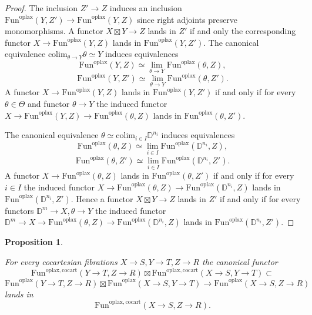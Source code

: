 \documentclass[10pt,oneside]{article}
\numberwithin{equation}{section} %
\numberwithin{figure}{section} %
\theoremstyle{plain}
\newtheorem{proposition}[theorem]{Proposition}
\theoremstyle{definition}
\newcommand{\bD}{{\mathbb D}}
\newcommand{\colim}{\mathrm{colim}}
\newcommand{\Fun}{\mathrm{Fun}}
\newcommand{\cocart}{{\mathrm{cocart}}}
\newcommand{\oplax}{{\mathrm{oplax}}}
\begin{document}
\begin{proof}

The inclusion $Z' \to Z$  induces an inclusion $\Fun^\oplax(Y, Z') \to \Fun^\oplax(Y, Z)$ since right adjoints preserve monomorphisms.
A functor $X \boxtimes Y \to Z$ lands in $Z'$
if and only the corresponding functor $X \to \Fun^\oplax(Y, Z)$
lands in $\Fun^\oplax(Y, Z')$.
The canonical equivalence $ \colim_{\theta \to Y} \theta \simeq Y$
induces equivalences
$$ \Fun^\oplax(Y, Z) \simeq \lim_{\theta \to Y} \Fun^\oplax(\theta, Z),$$
$$ \Fun^\oplax(Y, Z') \simeq \lim_{\theta \to Y} \Fun^\oplax(\theta, Z').$$
A functor $X \to \Fun^\oplax(Y, Z)$
lands in $\Fun^\oplax(Y, Z')$ if and only if for every $\theta \in \Theta$ and functor $\theta \to Y$ the induced functor $X \to \Fun^\oplax(Y, Z) \to \Fun^\oplax(\theta, Z)$
lands in $\Fun^\oplax(\theta, Z'). $

The canonical equivalence $\theta \simeq \colim_{i \in I} \bD^{n_i}$
induces equivalences
$$ \Fun^\oplax(\theta, Z) \simeq \lim_{i \in I} \Fun^\oplax(\bD^{n_i}, Z),$$
$$\Fun^\oplax(\theta, Z') \simeq \lim_{i \in I} \Fun^\oplax(\bD^{n_i}, Z').$$
A functor $X \to \Fun^\oplax(\theta, Z)$
lands in $\Fun^\oplax(\theta, Z')$ if and only if for every $i \in I$ the induced functor $X \to \Fun^\oplax(\theta, Z) \to \Fun^\oplax(\bD^{n_i}, Z)$
lands in $\Fun^\oplax(\bD^{n_i}, Z'). $
Hence a functor $X \boxtimes Y \to Z$ lands in $Z'$ if and only if for every functors $\bD^m \to X, \theta \to Y$
the induced functor $\bD^m \to X \to \Fun^\oplax(\theta, Z) \to \Fun^\oplax(\bD^{n_i}, Z)$
lands in $\Fun^\oplax(\bD^{n_i}, Z').$ 
\end{proof}



\begin{proposition}\label{comprest}

For every cocartesian fibrations $X \to S, Y \to T, Z \to R $
the canonical functor 
$$\Fun^{\oplax,\cocart}(Y \to T, Z \to R) \boxtimes \Fun^{\oplax, \cocart}(X \to S, Y \to T) \subset $$$$ \Fun^\oplax(Y \to T, Z \to R) \boxtimes \Fun^\oplax(X\to S, Y\to T) \to \Fun^\oplax(X \to S ,Z \to R) $$
lands in $$\Fun^{\oplax,\cocart}(X \to S, Z\to R).$$

\end{proposition}
\end{document}
